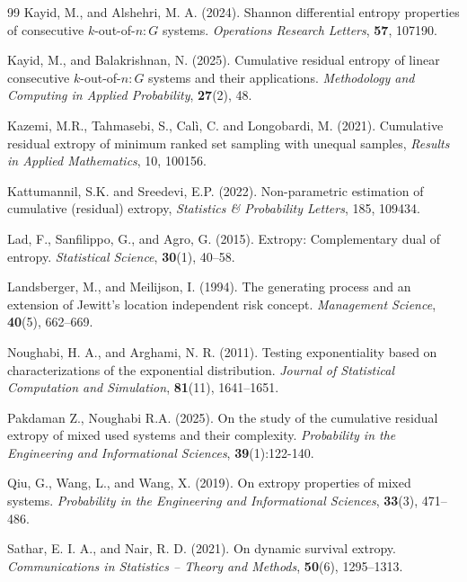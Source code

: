 \documentclass[12pt,a4paper]{article}
\numberwithin{equation}{section}
\begin{document}
\begin{thebibliography}{99}
Kayid, M., and Alshehri, M. A. (2024). Shannon differential entropy properties of consecutive $k$-out-of-$n:G$ systems. \textit{Operations Research Letters}, \textbf{57}, 107190.

Kayid, M., and Balakrishnan, N. (2025). Cumulative residual entropy of linear consecutive $k$-out-of-$n:G$ systems and their applications. \textit{Methodology and Computing in Applied Probability}, \textbf{27}(2), 48.

Kazemi, M.R., Tahmasebi, S., Calì, C. and Longobardi, M. (2021). Cumulative residual extropy of minimum ranked set sampling with unequal samples, \textit{Results in Applied Mathematics}, 10, 100156.

Kattumannil, S.K. and Sreedevi, E.P. (2022). Non-parametric estimation of cumulative (residual) extropy, \textit{Statistics \& Probability Letters}, 185, 109434.

Lad, F., Sanfilippo, G., and Agro, G. (2015). Extropy: Complementary dual of entropy. \textit{Statistical Science}, \textbf{30}(1), 40--58.

Landsberger, M., and Meilijson, I. (1994). The generating process and an extension of Jewitt’s location independent risk concept. \textit{Management Science}, \textbf{40}(5), 662--669.

Noughabi, H. A., and Arghami, N. R. (2011). Testing exponentiality based on characterizations of the exponential distribution. \textit{Journal of Statistical Computation and Simulation}, \textbf{81}(11), 1641--1651.

Pakdaman Z., Noughabi R.A. (2025). On the study of the cumulative residual extropy of mixed used systems and their complexity. \textit{Probability in the Engineering and Informational Sciences}, \textbf{39}(1):122-140. 

Qiu, G., Wang, L., and Wang, X. (2019). On extropy properties of mixed systems. \textit{Probability in the Engineering and Informational Sciences}, \textbf{33}(3), 471--486.

Sathar, E. I. A., and Nair, R. D. (2021). On dynamic survival extropy. \textit{Communications in Statistics -- Theory and Methods}, \textbf{50}(6), 1295--1313.


\end{thebibliography}
\end{document}
